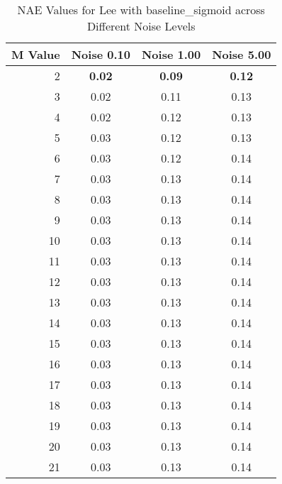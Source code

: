     \begin{table}[htb]
       \small

    \centering 
    \begin{tabular}{|r|ccc|}\hline
   M Value &  Noise 0.10 &  Noise 1.00 &  Noise 5.00 \\ \hline 
      2 &  \textbf{0.02} &  \textbf{0.09} &  \textbf{0.12}  \\ \hline 
      3 &  0.02 &  0.11 &  0.13  \\ \hline 
      4 &  0.02 &  0.12 &  0.13  \\ \hline 
      5 &  0.03 &  0.12 &  0.13  \\ \hline 
      6 &  0.03 &  0.12 &  0.14  \\ \hline 
      7 &  0.03 &  0.13 &  0.14  \\ \hline 
      8 &  0.03 &  0.13 &  0.14  \\ \hline 
      9 &  0.03 &  0.13 &  0.14  \\ \hline 
      10 &  0.03 &  0.13 &  0.14  \\ \hline 
      11 &  0.03 &  0.13 &  0.14  \\ \hline 
      12 &  0.03 &  0.13 &  0.14  \\ \hline 
      13 &  0.03 &  0.13 &  0.14  \\ \hline 
      14 &  0.03 &  0.13 &  0.14  \\ \hline 
      15 &  0.03 &  0.13 &  0.14  \\ \hline 
      16 &  0.03 &  0.13 &  0.14  \\ \hline 
      17 &  0.03 &  0.13 &  0.14  \\ \hline 
      18 &  0.03 &  0.13 &  0.14  \\ \hline 
      19 &  0.03 &  0.13 &  0.14  \\ \hline 
      20 &  0.03 &  0.13 &  0.14  \\ \hline 
      21 &  0.03 &  0.13 &  0.14  \\ \hline 
    \end{tabular}
    \caption{NAE Values for Lee with baseline_sigmoid across Different Noise Levels}
    \end{table}


